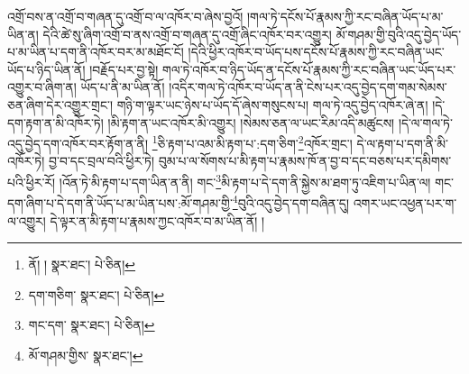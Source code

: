 འགྲོ་བས་ན་འགྲོ་བ་གཞན་དུ་འགྲོ་བ་ལ་འཁོར་བ་ཞེས་བྱའོ། །གལ་ཏེ་དངོས་པོ་རྣམས་ཀྱི་རང་བཞིན་ཡོད་པ་མ་ཡིན་ན། དེའི་ཚེ་སུ་ཞིག་འགྲོ་བ་ནས་འགྲོ་བ་གཞན་དུ་འགྲོ་ཞིང་འཁོར་བར་འགྱུར། མོ་གཤམ་གྱི་བུའི་འདུ་བྱེད་ཡོད་པ་མ་ཡིན་པ་དག་ནི་འཁོར་བར་མ་མཐོང་ངོ། །དེའི་ཕྱིར་འཁོར་བ་ཡོད་པས་དངོས་པོ་རྣམས་ཀྱི་རང་བཞིན་ཡང་ཡོད་པ་ཉིད་ཡིན་ནོ། །བརྗོད་པར་བྱ་སྟེ། གལ་ཏེ་འཁོར་བ་ཉིད་ཡོད་ན་དངོས་པོ་རྣམས་ཀྱི་རང་བཞིན་ཡང་ཡོད་པར་འགྱུར་བ་ཞིག་ན། ཡོད་པ་ནི་མ་ཡིན་ནོ། །འདིར་གལ་ཏེ་འཁོར་བ་ཡོད་ན་ནི་ངེས་པར་འདུ་བྱེད་དག་གམ་སེམས་ཅན་ཞིག་དེར་འགྱུར་གྲང་། གཉི་ག་ལྟར་ཡང་ཉེས་པ་ཡོད་དོ་ཞེས་གསུངས་པ། གལ་ཏེ་འདུ་བྱེད་འཁོར་ཞེ་ན། །དེ་དག་རྟག་ན་མི་འཁོར་ཏེ། །མི་རྟག་ན་ཡང་འཁོར་མི་འགྱུར། །སེམས་ཅན་ལ་ཡང་རིམ་འདི་མཚུངས། །དེ་ལ་གལ་ཏེ་འདུ་བྱེད་དག་འཁོར་བར་རྟོག་ན་ནི། \footnote{ནོ། །   སྣར་ཐང་།  པེ་ཅིན། }ཅི་རྟག་པ་འམ་མི་རྟག་པ་:དག་ཅིག་\footnote{དག་གཅིག་  སྣར་ཐང་།  པེ་ཅིན། }འཁོར་གྲང་། དེ་ལ་རྟག་པ་དག་ནི་མི་འཁོར་ཏེ། བྱ་བ་དང་བྲལ་བའི་ཕྱིར་ཏེ། བུམ་པ་ལ་སོགས་པ་མི་རྟག་པ་རྣམས་ཁོ་ན་བྱ་བ་དང་བཅས་པར་དམིགས་པའི་ཕྱིར་རོ། །འོན་ཏེ་མི་རྟག་པ་དག་ཡིན་ན་ནི། གང་\footnote{གང་དག་  སྣར་ཐང་།  པེ་ཅིན། }མི་རྟག་པ་དེ་དག་ནི་སྐྱེས་མ་ཐག་ཏུ་འཇིག་པ་ཡིན་ལ། གང་དག་ཞིག་པ་དེ་དག་ནི་ཡོད་པ་མ་ཡིན་པས་:མོ་གཤམ་གྱི་\footnote{མོ་གཤམ་གྱིས་  སྣར་ཐང་། }བུའི་འདུ་བྱེད་དག་བཞིན་དུ། འགར་ཡང་འཕྱན་པར་ག་ལ་འགྱུར། དེ་ལྟར་ན་མི་རྟག་པ་རྣམས་ཀྱང་འཁོར་བ་མ་ཡིན་ནོ། །
